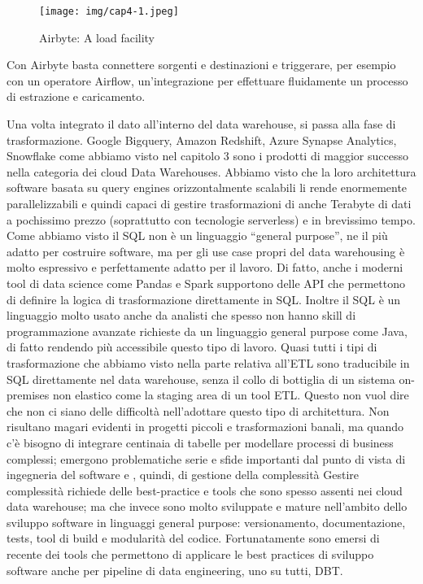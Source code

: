 \documentclass[a4paper,12pt]{report}
\begin{document}
\begin{figure}[h]
    \centering
    \texttt{[image: img/cap4-1.jpeg]}
    \caption{Airbyte: A load facility}
\end{figure}

Con Airbyte basta connettere sorgenti e destinazioni e triggerare, per esempio con un operatore Airflow, un’integrazione per effettuare fluidamente un processo di estrazione e caricamento.


Una volta integrato il dato all’interno del data warehouse, si passa alla fase di trasformazione.
Google Bigquery, Amazon Redshift, Azure Synapse Analytics, Snowflake come abbiamo visto nel capitolo 3 sono i prodotti di maggior successo nella categoria dei cloud Data Warehouses. 
Abbiamo visto che la loro architettura software basata su query engines orizzontalmente scalabili li rende enormemente parallelizzabili e quindi capaci di gestire trasformazioni di anche Terabyte di dati a pochissimo prezzo (soprattutto con tecnologie serverless) e in brevissimo tempo.
Come abbiamo visto il SQL non è un linguaggio “general purpose”, ne il più adatto per costruire software, ma per gli use case propri del data warehousing è molto espressivo e perfettamente adatto per il lavoro. 
Di fatto, anche i moderni tool di data science come Pandas e Spark supportono delle API che permettono di definire la logica di trasformazione direttamente in SQL. Inoltre il SQL è un linguaggio molto usato anche da analisti che spesso non hanno skill di programmazione avanzate richieste da un linguaggio general purpose come Java, di fatto rendendo più accessibile questo tipo di lavoro.
Quasi tutti i tipi di trasformazione che abbiamo visto nella parte relativa all’ETL sono traducibile in SQL direttamente nel data warehouse, senza il collo di bottiglia di un sistema on-premises non elastico come la staging area di un tool ETL.
Questo non vuol dire che non ci siano delle difficoltà nell’adottare questo tipo di architettura. Non risultano magari evidenti in progetti piccoli e trasformazioni banali, ma quando c’è bisogno di integrare centinaia di tabelle per modellare processi di business complessi; emergono problematiche serie e sfide importanti dal punto di vista di ingegneria del software e , quindi, di gestione della complessità
Gestire complessità richiede delle best-practice e tools che sono spesso assenti nei cloud data warehouse; ma che invece sono molto sviluppate e mature nell’ambito dello sviluppo software in linguaggi general purpose: versionamento, documentazione, tests, tool di build e modularità del codice. 
Fortunatamente  sono emersi di recente dei tools che permettono di applicare le best practices di sviluppo software anche per pipeline di data engineering, uno su tutti, DBT.
\end{document}
